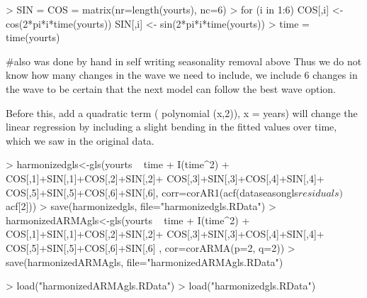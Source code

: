 \documentclass[11pt, a4paper]{article} %
\begin{document}
\begin{Schunk}
\begin{Sinput}
> SIN = COS = matrix(nr=length(yourts), nc=6)
> for (i in 1:6) {
   COS[,i] <- cos(2*pi*i*time(yourts))
   SIN[,i] <- sin(2*pi*i*time(yourts)) 
 }
> time = time(yourts)
\end{Sinput}
\end{Schunk}
#also was done by hand in self writing seasonality removal above
Thus we do not know how many changes in the wave we need to include, we include 6 changes in the wave to be certain that the next model can follow the best wave option. 

Before this, add a quadratic term ( polynomial (x,2)), x = years) will change the linear regression by including a slight bending in the fitted values over time, which we saw in the original data. 

\begin{Schunk}
\begin{Sinput}
> harmonizedgls<-gls(yourts ~ time + I(time^2) +
                     COS[,1]+SIN[,1]+COS[,2]+SIN[,2]+
                     COS[,3]+SIN[,3]+COS[,4]+SIN[,4]+
                     COS[,5]+SIN[,5]+COS[,6]+SIN[,6],
                   corr=corAR1(acf(dataseasongls$residuals)$acf[2]))
> save(harmonizedgls, file="harmonizedgls.RData")
> harmonizedARMAgls<-gls(yourts ~ time + I(time^2) +
                       COS[,1]+SIN[,1]+COS[,2]+SIN[,2]+
                       COS[,3]+SIN[,3]+COS[,4]+SIN[,4]+
                       COS[,5]+SIN[,5]+COS[,6]+SIN[,6]
                     , cor=corARMA(p=2, q=2))
> save(harmonizedARMAgls, file="harmonizedARMAgls.RData")
\end{Sinput}
\end{Schunk}

\begin{Schunk}
\begin{Sinput}
> load("harmonizedARMAgls.RData")
> load("harmonizedgls.RData")
\end{Sinput}
\end{Schunk}
\end{document}
